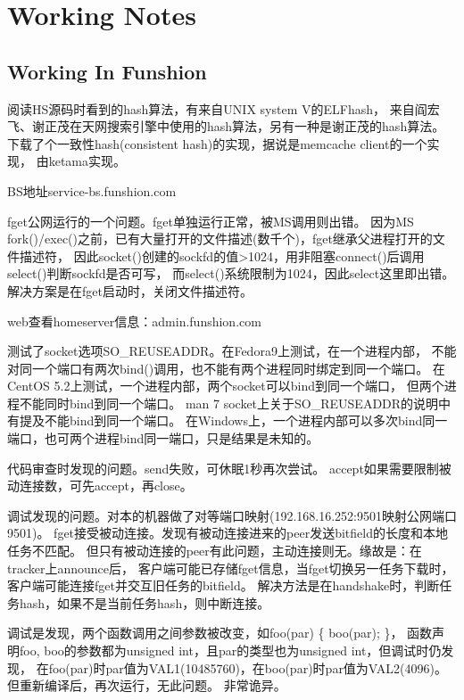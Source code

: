 \chapter{Working Notes}
\section{Working In Funshion}
 阅读HS源码时看到的hash算法，有来自UNIX system V的ELFhash，
来自阎宏飞、谢正茂在天网搜索引擎中使用的hash算法，另有一种是谢正茂的hash算法。
下载了个一致性hash(consistent hash)的实现，据说是memcache client的一个实现，
由ketama实现。

 BS地址service-bs.funshion.com

 fget公网运行的一个问题。fget单独运行正常，被MS调用则出错。
因为MS fork()/exec()之前，已有大量打开的文件描述(数千个)，fget继承父进程打开的文件描述符，
因此socket()创建的sockfd的值>1024，用非阻塞connect()后调用select()判断sockfd是否可写，
而select()系统限制为1024，因此select这里即出错。解决方案是在fget启动时，关闭文件描述符。

 web查看homeserver信息：admin.funshion.com

 测试了socket选项SO\_REUSEADDR。在Fedora9上测试，在一个进程内部，
不能对同一个端口有两次bind()调用，也不能有两个进程同时绑定到同一个端口。
在CentOS 5.2上测试，一个进程内部，两个socket可以bind到同一个端口，
但两个进程不能同时bind到同一个端口。
man 7 socket上关于SO\_REUSEADDR的说明中有提及不能bind到同一个端口。
在Windows上，一个进程内部可以多次bind同一端口，也可两个进程bind同一端口，只是结果是未知的。

 代码审查时发现的问题。send失败，可休眠1秒再次尝试。
accept如果需要限制被动连接数，可先accept，再close。

 调试发现的问题。对本的机器做了对等端口映射(192.168.16.252:9501映射公网端口9501)。
fget接受被动连接。发现有被动连接进来的peer发送bitfield的长度和本地任务不匹配。
但只有被动连接的peer有此问题，主动连接则无。缘故是：在tracker上announce后，
客户端可能已存储fget信息，当fget切换另一任务下载时，客户端可能连接fget并交互旧任务的bitfield。
解决方法是在handshake时，判断任务hash，如果不是当前任务hash，则中断连接。

 调试是发现，两个函数调用之间参数被改变，如foo(par) \{ boo(par); \}，
函数声明foo, boo的参数都为unsigned int，且par的类型也为unsigned int，但调试时仍发现，
在foo(par)时par值为VAL1(10485760)，在boo(par)时par值为VAL2(4096)。但重新编译后，再次运行，无此问题。
非常诡异。

